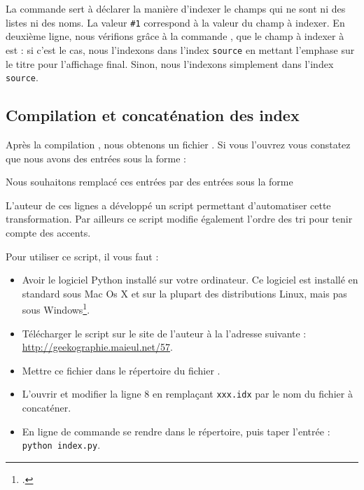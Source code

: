 \begin{bashcode}
\begin{latexcode}
\end{latexcode}

La commande  sert à déclarer la manière d'indexer le champs qui ne sont ni des listes ni des noms. La valeur \verb|#1| correspond à la valeur du champ à indexer. En deuxième ligne, nous vérifions grâce à la commande , que le champ à indexer à est  : si c'est le cas, nous l'indexons dans l'index \verb|source| en mettant l'emphase sur le titre pour l'affichage final. Sinon, nous l'indexons simplement dans l'index \verb|source|.

\subsection{Compilation et concaténation des index}


Après la  compilation \XeLaTeX, nous obtenons un fichier . Si vous l'ouvrez vous constatez que nous avons des entrées sous la forme : 

\begin{latexcode}
\end{latexcode}

Nous souhaitons remplacé ces entrées par des entrées sous la forme 

\begin{latexcode}
\end{latexcode}

L'auteur de ces lignes a développé un script permettant d'automatiser cette transformation. Par ailleurs ce script modifie également l'ordre des tri pour tenir compte des accents.

Pour utiliser ce script, il vous faut :\label{python}
\begin{itemize}
\item Avoir le logiciel Python installé sur votre ordinateur. Ce logiciel est installé en standard sous Mac Os X et sur la plupart des distributions Linux, mais pas sous Windows\footcite{python_windows}.
\item Télécharger le script sur le site de l'auteur à la l'adresse suivante : \url{http://geekographie.maieul.net/57}.
\item Mettre ce fichier dans le répertoire du fichier . 
\item L'ouvrir et modifier la ligne 8 en remplaçant \verb|xxx.idx| par le nom du fichier à concaténer.
\item En ligne de commande se rendre dans le  répertoire, puis taper l'entrée : \verb|python index.py|.
\end{itemize}



\end{bashcode}
